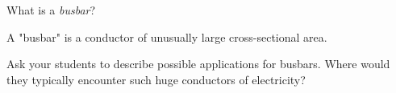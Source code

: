 

What is a {\it busbar}?







A "busbar" is a conductor of unusually large cross-sectional area.







Ask your students to describe possible applications for busbars.  Where would they typically encounter such huge conductors of electricity?




